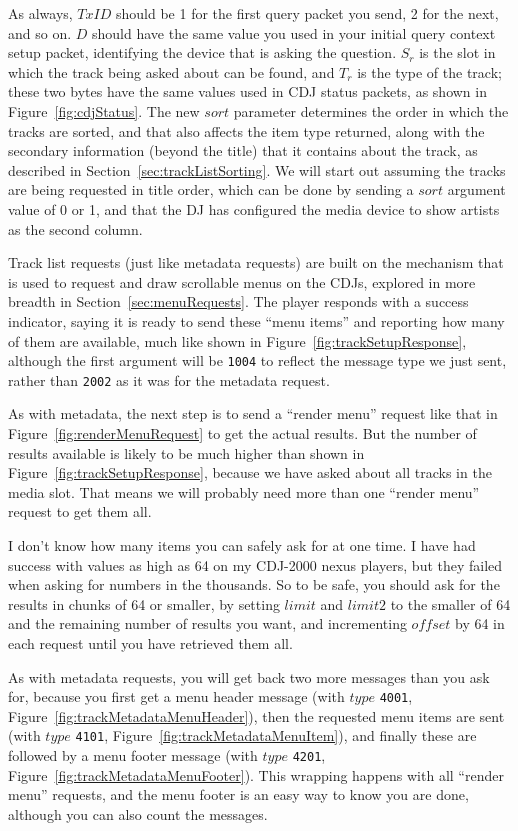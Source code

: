 \documentclass[11pt]{article}
\begin{document}
As always, $TxID$ should be 1 for the first query packet you send, 2
for the next, and so on. $D$ should have the same value you used in
your initial query context setup packet, identifying the device that
is asking the question. $S_r$ is the slot in which the track being
asked about can be found, and $T_r$ is the type of the track; these
two bytes have the same values used in CDJ status packets, as shown in
Figure~\ref{fig:cdjStatus}. The new $sort$ parameter determines the
order in which the tracks are sorted, and that also affects the item
type returned, along with the secondary information (beyond the title)
that it contains about the track, as described in
Section~\ref{sec:trackListSorting}. We will start out assuming the
tracks are being requested in title order, which can be done by
sending a $sort$ argument value of 0 or 1, and that the DJ has
configured the media device to show artists as the second column.

Track list requests (just like metadata requests) are built on the
mechanism that is used to request and draw scrollable menus on the
CDJs, explored in more breadth in Section~\ref{sec:menuRequests}. The
player responds with a success indicator, saying it is ready to send
these ``menu items'' and reporting how many of them are available,
much like shown in Figure~\ref{fig:trackSetupResponse}, although the
first argument will be {\tt 1004} to reflect the message type we just
sent, rather than {\tt 2002} as it was for the metadata request.

As with metadata, the next step is to send a ``render menu'' request
like that in Figure~\ref{fig:renderMenuRequest} to get the actual
results. But the number of results available is likely to be much
higher than shown in Figure~\ref{fig:trackSetupResponse}, because we
have asked about all tracks in the media slot. That means we will
probably need more than one ``render menu'' request to get them all.

I don't know how many items you can safely ask for at one time. I have
had success with values as high as 64 on my CDJ-2000 nexus players,
but they failed when asking for numbers in the thousands. So to be
safe, you should ask for the results in chunks of 64 or smaller, by
setting $limit$ and $limit2$ to the smaller of 64 and the remaining
number of results you want, and incrementing $offset$ by 64 in each
request until you have retrieved them all.

As with metadata requests, you will get back two more messages than
you ask for, because you first get a menu header message (with $type$
{\tt 4001}, Figure~\ref{fig:trackMetadataMenuHeader}), then the
requested menu items are sent (with $type$ {\tt 4101},
Figure~\ref{fig:trackMetadataMenuItem}), and finally these are
followed by a menu footer message (with $type$ {\tt 4201},
Figure~\ref{fig:trackMetadataMenuFooter}). This wrapping happens with
all ``render menu'' requests, and the menu footer is an easy way to
know you are done, although you can also count the messages.
\end{document}
